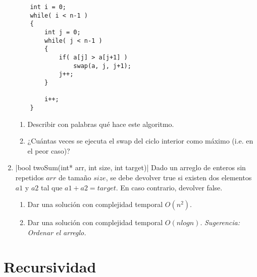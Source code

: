 \documentclass[titlepage,oneside]{book}
\begin{document}
\begin{enumerate}
    \begin{verbatim}
    int i = 0;
    while( i < n-1 )
    {
        int j = 0;
        while( j < n-1 )
        {
            if( a[j] > a[j+1] )
                swap(a, j, j+1);
            j++;
        }
        
        i++;
    }
    \end{verbatim} 

    \begin{enumerate}
        \item Describir con palabras qué hace este algoritmo.
        \item ¿Cuántas veces se ejecuta el swap del ciclo interior como máximo (i.e. en el peor caso)?
    \end{enumerate}

    \item{}|bool twoSum(int* arr, int size, int target)|
    Dado un arreglo de enteros sin repetidos $arr$ de tamaño $size$, se debe devolver true si existen dos elementos $a1$ y $a2$ tal que $a1 + a2 = target$. En caso contrario, devolver false.
    \begin{enumerate}
        \item Dar una solución con complejidad temporal $O(n^2)$.
        \item Dar una solución con complejidad temporal $O(n logn)$. \newline\textit{Sugerencia: Ordenar el arreglo.}
    \end{enumerate}
    
\end{enumerate}

\chapter{Recursividad}
\end{document}
